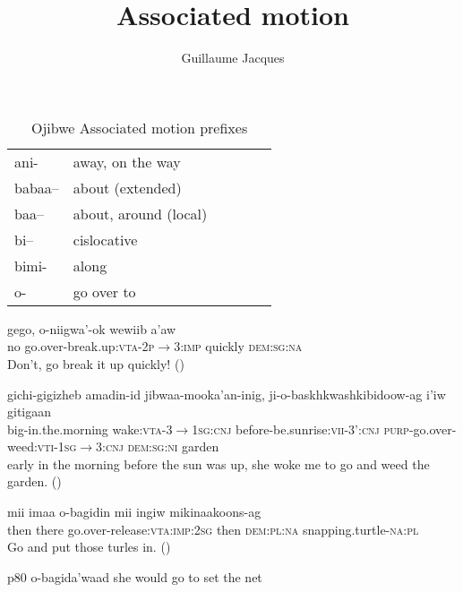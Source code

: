 \documentclass[oldfontcommands,oneside,a4paper,11pt]{article}
\begin{document}
 
 \title{Associated motion} 
\author{Guillaume Jacques}
\maketitle
\linenumbers
\sloppy

\citet[728-734]{valentine01grammar}


\begin{table}[H]
\caption{Ojibwe Associated motion prefixes }\label{tab:ojb.am} \centering
\begin{tabular}{llllll}
\toprule
ani- &away, on the way\\
babaa--&about (extended)\\
baa-- &about, around (local)\\
bi--	&cislocative\\
bimi- &along\\
o- &go over to\\
\bottomrule
\end{tabular}
\end{table}

\citet{kegg93portage}

\begin{exe}
\ex 
\gll
gego, o-niigwa'-ok wewiib a'aw \\
no go.over-break.up:\textsc{vta}-\textsc{2p$\rightarrow$3:imp} quickly \textsc{dem:sg:na} \\
\glt Don't, go break it up quickly! (\citealt[150]{kegg93portage})
\end{exe}

\begin{exe}
\ex 
\gll
gichi-gigizheb amadin-id jibwaa-mooka'an-inig, ji-o-baskhkwashkibidoow-ag i'iw gitigaan \\
big-in.the.morning wake:\textsc{vta}-3$\rightarrow$\textsc{1sg}:\textsc{cnj} before-be.sunrise:\textsc{vii}-3':\textsc{cnj}
\textsc{purp}-go.over-weed:\textsc{vti}-\textsc{1sg}$\rightarrow$3:\textsc{cnj} \textsc{dem:sg:ni} garden \\
\glt early in the morning before the sun was up, she woke me to go and weed the garden. (\citealt[42]{kegg93portage})
\end{exe}

\begin{exe}
\ex 
\gll
mii imaa o-bagidin mii ingiw mikinaakoons-ag \\
then there go.over-release:\textsc{vta}:\textsc{imp:2sg} then \textsc{dem:pl:na} snapping.turtle-\textsc{na:pl} \\
\glt Go and put those turles in. (\citealt[51]{kegg93portage})
\end{exe}
p80 o-bagida'waad she would go to set the net
\end{document}
